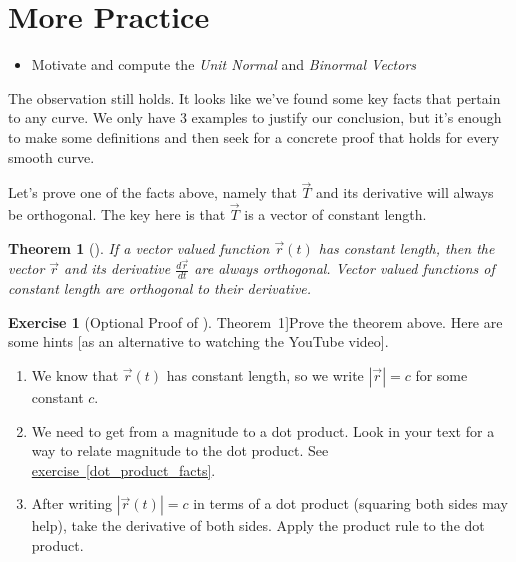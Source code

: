 \documentclass[10pt,]{book}
\theoremstyle{plain}
\newtheorem{theorem}{Theorem}[section]
\theoremstyle{definition}
\theoremstyle{definition}
\theoremstyle{definition}
\theoremstyle{definition}
\newtheorem{exploration}[project]{Exercise}
\theoremstyle{definition}
\numberwithin{equation}{section}
\newcommand{\ds}{\displaystyle}
\begin{document}
\section[{More Practice}]{More Practice}\label{section-27}
\leavevmode%
\begin{itemize}[label=\textbullet]
\item{}Motivate and compute the \emph{Unit Normal} and \emph{Binormal Vectors}%
\end{itemize}
The observation still holds. It looks like we've found some key facts that pertain to any curve. We only have 3 examples to justify our conclusion, but it's enough to make some definitions and then seek for a concrete proof that holds for every smooth curve.%
\par
Let's prove one of the facts above, namely that \(\vec T\) and its derivative will always be orthogonal. The key here is that \(\vec T\) is a vector of constant length.%
\begin{theorem}[{}]\label{vector_valued_functions_of_constant_length}
If a vector valued function \(\vec r(t)\) has constant length, then the vector \(\vec r\) and its derivative \(\ds\frac{d\vec r}{dt}\) are always orthogonal. Vector valued functions of constant length are orthogonal to their derivative.%
\end{theorem}
\begin{exploration}[Optional Proof of \hyperref[vector_valued_functions_of_constant_length]{Theorem~1}]\label{exploration-176}
Prove the theorem above. Here are some hints [as an alternative to watching the YouTube video]. \leavevmode%
\begin{itemize}[label=\textbullet]
\begin{enumerate}[font=\bfseries,label=(\alph*),ref=\alph*]
\item\label{task-432} We know that \(\vec r(t)\) has constant length, so we write \(|\vec r|=c\) for some constant \(c\).%
\item\label{task-433} We need to get from a magnitude to a dot product. Look in your text for a way to relate magnitude to the dot product. See \hyperref[dot_product_facts]{exercise~\ref{dot_product_facts}}.%
\item\label{task-434} After writing \(|\vec r(t)|=c\) in terms of a dot product (squaring both sides may help), take the derivative of both sides. Apply the product rule to the dot product.%
\end{enumerate}
\end{itemize}
%
\end{exploration}
\end{document}
